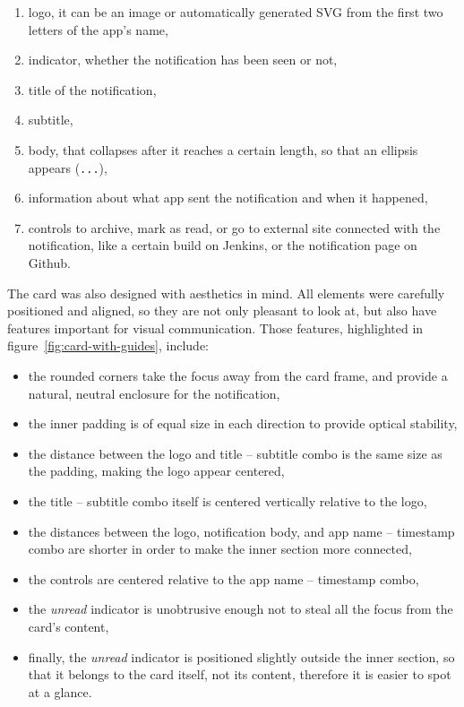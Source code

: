 \begin{enumerate}
      \item
            logo,
            it can be an image
            or automatically generated \ac{SVG}
            from the first two letters of the app's name,
      \item
            indicator,
            whether the notification has been seen or not,
      \item
            title of the notification,
      \item
            subtitle,
      \item
            body,
            that collapses after it reaches a certain length,
            so that an ellipsis appears (\texttt{...}),
      \item
            information about what app sent the notification and when it happened,
      \item
            controls to archive,
            mark as read,
            or go to external site connected with the notification,
            like a certain build on Jenkins,
            or the notification page on Github.
\end{enumerate}

The card was also designed with aesthetics in mind.
All elements were carefully positioned and aligned,
so they are not only pleasant to look at,
but also have features important for visual communication.
Those features, highlighted in figure~\ref{fig:card-with-guides}, include:

\begin{itemize}
      \item
            the rounded corners take the focus away from the card frame,
            and provide a natural, neutral enclosure for the notification,
      \item
            the inner padding is of equal size in each direction
            to provide optical stability,
      \item
            the distance between the logo and title -- subtitle combo
            is the same size as the padding,
            making the logo appear centered,
      \item
            the title -- subtitle combo itself
            is centered vertically relative to the logo,
      \item
            the distances between the logo,
            notification body, and app name -- timestamp combo are shorter
            in order to make the inner section more connected,
      \item
            the controls are centered relative to the app name -- timestamp combo,
      \item
            the \textit{unread} indicator is unobtrusive enough
            not to steal all the focus from the card's content,
      \item
            finally, the \textit{unread} indicator
            is positioned slightly outside the inner section,
            so that it belongs to the card itself,
            not its content,
            therefore it is easier to spot at a glance.
\end{itemize}

